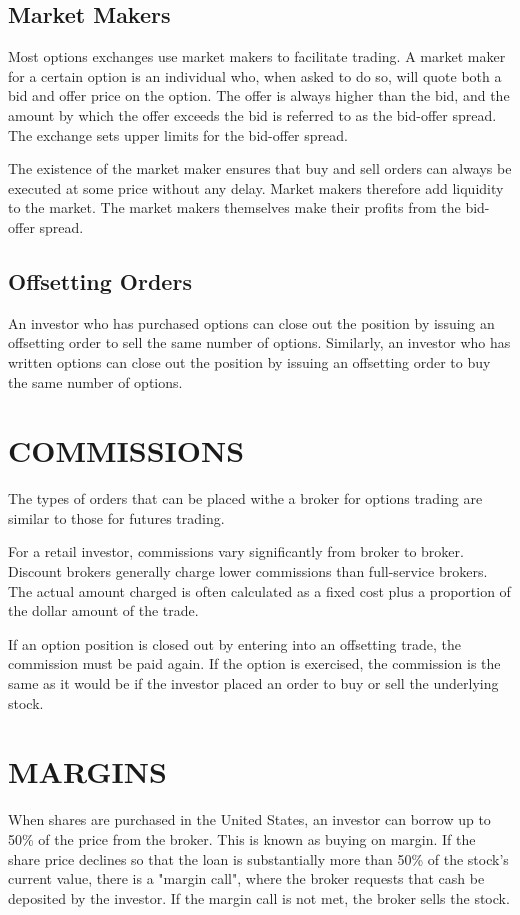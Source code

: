 \documentclass{article}
\begin{document}
\subsection{Market Makers}
Most options exchanges use market makers to facilitate trading. A market maker for a certain option is an individual who, when asked to do so, will quote both a bid and offer price on the option. The offer is always higher than the bid, and the amount by which the offer exceeds the bid is referred to as the bid-offer spread. The exchange sets upper limits for the bid-offer spread.

The existence of the market maker ensures that buy and sell orders can always be executed at some price	without any delay. Market makers therefore add liquidity to the market. The market makers themselves make their profits from the bid-offer spread.

\subsection{Offsetting Orders}
An investor who has purchased options can close out the position by issuing an offsetting order to sell the same number of options. Similarly, an investor who has written options can close out the position by issuing an offsetting order to buy the same number of options.

\section{COMMISSIONS}
The types of orders that can be placed withe a broker for options trading are similar to those for futures trading.

For a retail investor, commissions vary significantly from broker to broker. Discount brokers generally charge lower commissions than full-service  brokers. The actual amount charged is often calculated as a fixed cost plus a proportion of the dollar amount of the trade.

If an option position is closed out by entering into an offsetting trade, the commission must be paid again. If the option is exercised, the commission is the same as it would be if the investor placed an order to buy or sell the underlying stock.

\section{MARGINS}
When shares are purchased in the United States, an investor can borrow up to 50\% of the price from the broker. This is known as buying on margin. If the share price declines so that the loan is substantially more than 50\% of the stock's current value, there is a "margin call", where the broker requests that cash be deposited by the investor. If the margin call is not met, the broker sells the stock.
\end{document}
